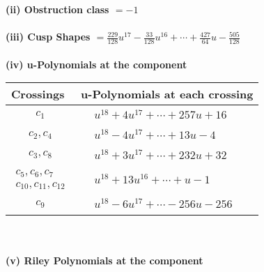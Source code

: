 \documentclass[1p]{elsarticle_modified}
\theoremstyle{definition}
\begin{document}
\flushleft \textbf{(ii) Obstruction class $= -1$}\\~\\
\flushleft \textbf{(iii) Cusp Shapes $= \frac{229}{128} u^{17}-\frac{33}{128} u^{16}+\cdots+\frac{427}{64} u-\frac{505}{128}$}\\~\\
\newpage\renewcommand{\arraystretch}{1}
\flushleft \textbf{(iv) u-Polynomials at the component}\newline \\
\begin{tabular}{m{50pt}|m{274pt}}
Crossings & \hspace{64pt}u-Polynomials at each crossing \\
\hline $$\begin{aligned}c_{1}\end{aligned}$$&$\begin{aligned}
&u^{18}+4 u^{17}+\cdots+257 u+16
\end{aligned}$\\
\hline $$\begin{aligned}c_{2},c_{4}\end{aligned}$$&$\begin{aligned}
&u^{18}-4 u^{17}+\cdots+13 u-4
\end{aligned}$\\
\hline $$\begin{aligned}c_{3},c_{8}\end{aligned}$$&$\begin{aligned}
&u^{18}+3 u^{17}+\cdots+232 u+32
\end{aligned}$\\
\hline $$\begin{aligned}c_{5},c_{6},c_{7}\\c_{10},c_{11},c_{12}\end{aligned}$$&$\begin{aligned}
&u^{18}+13 u^{16}+\cdots+u-1
\end{aligned}$\\
\hline $$\begin{aligned}c_{9}\end{aligned}$$&$\begin{aligned}
&u^{18}-6 u^{17}+\cdots-256 u-256
\end{aligned}$\\
\hline
\end{tabular}\\~\\
\newpage\renewcommand{\arraystretch}{1}
\flushleft \textbf{(v) Riley Polynomials at the component}\newline \\
\end{document}
